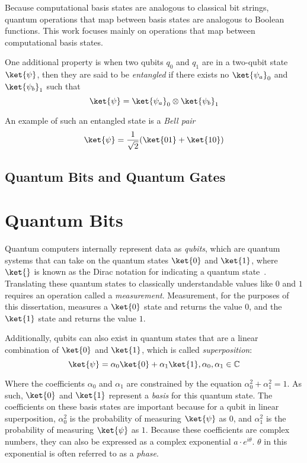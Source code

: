 Because computational basis states are analogous to classical bit strings, quantum operations that map
between basis states are analogous to Boolean functions. This work focuses mainly on operations
that map between computational basis states.

One additional property is when two qubits $q_0$ and $q_1$ are in a two-qubit state $\ket{\psi}$,
then they are said to be {\it entangled} if there exists no $\ket{\psi_a}_{0}$ and $\ket{\psi_b}_{1}$
such that
\begin{equation}
        \ket{\psi} = \ket{\psi_a}_{0} \otimes \ket{\psi_b}_{1}
\end{equation}

An example of such an entangled state is a {\it Bell pair}
\begin{equation}
        \ket{\psi} = \frac{1}{\sqrt{2}} (\ket{01} + \ket{10})
\end{equation}


\subsection{Quantum Bits and Quantum Gates}
\section{Quantum Bits}
\label{Chap:Pre-qubits}
Quantum computers internally represent data as \emph{qubits}, which are quantum systems that can
take on the quantum states $\ket{0}$ and $\ket{1}$, where $\ket{}$ is known as the Dirac
notation for indicating a quantum state~\cite{bib-mike-and-ike}. Translating these quantum states to classically understandable values like $0$ and $1$ requires an operation called a
{\it measurement}. Measurement, for the purposes of this dissertation, measures a $\ket{0}$ state and returns
the value $0$, and the $\ket{1}$ state and returns the value $1$.

Additionally, qubits can also exist in quantum states that are a linear combination of $\ket{0}$ and
$\ket{1}$, which is called {\it superposition}:
\begin{equation}
\ket{\psi} = \alpha_0 \ket{0} + \alpha_1 \ket{1}, \alpha_0, \alpha_1 \in \mathbb{C}
\end{equation}

Where the coefficients $\alpha_0$ and $\alpha_1$ are constrained by the equation $\alpha_0^2 + \alpha_1^2 = 1$.
As such, $\ket{0}$ and $\ket{1}$ represent a {\it basis} for this quantum state. The coefficients on these basis
states are important because for a qubit in linear superposition, $\alpha_0^2$ is the probability of measuring
$\ket{\psi}$ as $0$, and $\alpha_1^2$ is the probability of measuring $\ket{\psi}$ as $1$. Because these
coefficients are complex numbers, they can also be expressed as a complex exponential $a\cdot e^{i \theta}$.
$\theta$ in this exponential is often referred to as a {\it phase}.

